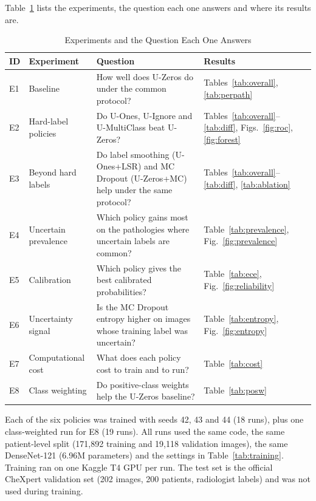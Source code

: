 \documentclass[conference]{IEEEtran}
\begin{document}
Table~\ref{tab:experiments} lists the experiments, the question each one answers and where its results are.

\begin{table}[!t]
\centering
\caption{Experiments and the Question Each One Answers}
\label{tab:experiments}
\small
\begin{tabular}{@{}p{0.6cm}p{3.0cm}p{8.4cm}p{4.2cm}@{}}
\toprule
\textbf{ID} & \textbf{Experiment} & \textbf{Question} & \textbf{Results} \\
\midrule
E1 & Baseline & How well does U-Zeros do under the common protocol? & Tables~\ref{tab:overall}, \ref{tab:perpath} \\
E2 & Hard-label policies & Do U-Ones, U-Ignore and U-MultiClass beat U-Zeros? & Tables~\ref{tab:overall}--\ref{tab:diff}, Figs.~\ref{fig:roc}, \ref{fig:forest} \\
E3 & Beyond hard labels & Do label smoothing (U-Ones+LSR) and MC Dropout (U-Zeros+MC) help under the same protocol? & Tables~\ref{tab:overall}--\ref{tab:diff}, \ref{tab:ablation} \\
E4 & Uncertain prevalence & Which policy gains most on the pathologies where uncertain labels are common? & Table~\ref{tab:prevalence}, Fig.~\ref{fig:prevalence} \\
E5 & Calibration & Which policy gives the best calibrated probabilities? & Table~\ref{tab:ece}, Fig.~\ref{fig:reliability} \\
E6 & Uncertainty signal & Is the MC Dropout entropy higher on images whose training label was uncertain? & Table~\ref{tab:entropy}, Fig.~\ref{fig:entropy} \\
E7 & Computational cost & What does each policy cost to train and to run? & Table~\ref{tab:cost} \\
E8 & Class weighting & Do positive-class weights help the U-Zeros baseline? & Table~\ref{tab:posw} \\
\bottomrule
\end{tabular}
\end{table}

Each of the six policies was trained with seeds 42, 43 and 44 (18 runs), plus one class-weighted run for E8 (19 runs). All runs used the same code, the same patient-level split (171{,}892 training and 19{,}118 validation images), the same DenseNet-121 (6.96M parameters) and the settings in Table~\ref{tab:training}. Training ran on one Kaggle T4 GPU per run. The test set is the official CheXpert validation set (202 images, 200 patients, radiologist labels) and was not used during training.
\end{document}
